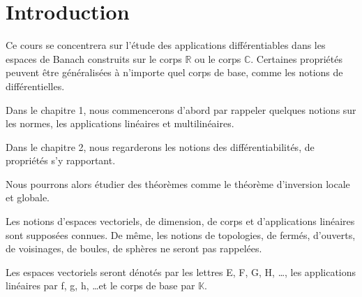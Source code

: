 \chapter*{Introduction}

Ce cours se concentrera sur l'étude des applications différentiables dans les
espaces de Banach construits sur le corps $\mathbb{R}$ ou le corps $\mathbb{C}$.
Certaines propriétés peuvent être généralisées à n'importe quel corps de base,
comme les notions de différentielles.

Dans le chapitre 1, nous commencerons d'abord par rappeler quelques notions sur
les normes, les applications linéaires et multilinéaires.

Dans le chapitre 2, nous regarderons les notions des différentiabilités, de propriétés s'y
rapportant.

Nous pourrons alors étudier des théorèmes comme le théorème d'inversion locale
et globale.

Les notions d'espaces vectoriels, de dimension, de corps et d'applications
linéaires sont supposées connues. De même, les notions de topologies, de fermés,
d'ouverts, de voisinages, de boules, de sphères ne seront pas rappelées.

Les espaces vectoriels seront dénotés par les lettres E, F, G, H, \ldots, les
applications linéaires par f, g, h, \ldots et le corps de base par $\mathbb{K}$.
